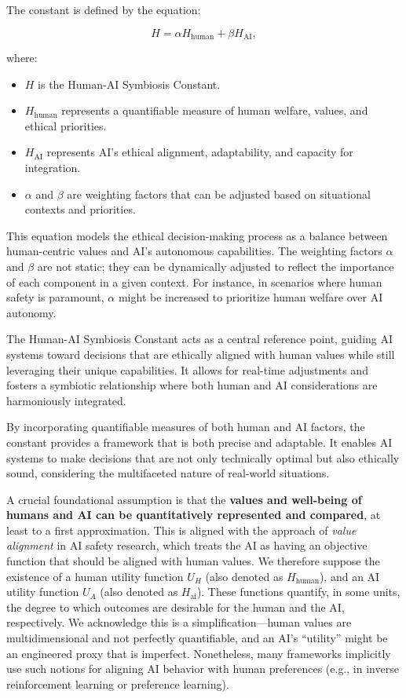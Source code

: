 \documentclass[12pt]{article}
\begin{document}
The constant is defined by the equation:

\begin{equation}
H = \alpha H_{\text{human}} + \beta H_{\text{AI}},
\end{equation}

where:

\begin{itemize}
    \item $H$ is the Human-AI Symbiosis Constant.
    \item $H_{\text{human}}$ represents a quantifiable measure of human welfare, values, and ethical priorities.
    \item $H_{\text{AI}}$ represents AI's ethical alignment, adaptability, and capacity for integration.
    \item $\alpha$ and $\beta$ are weighting factors that can be adjusted based on situational contexts and priorities.
\end{itemize}

This equation models the ethical decision-making process as a balance between human-centric values and AI's autonomous capabilities. The weighting factors $\alpha$ and $\beta$ are not static; they can be dynamically adjusted to reflect the importance of each component in a given context. For instance, in scenarios where human safety is paramount, $\alpha$ might be increased to prioritize human welfare over AI autonomy.

The Human-AI Symbiosis Constant acts as a central reference point, guiding AI systems toward decisions that are ethically aligned with human values while still leveraging their unique capabilities. It allows for real-time adjustments and fosters a symbiotic relationship where both human and AI considerations are harmoniously integrated.

By incorporating quantifiable measures of both human and AI factors, the constant provides a framework that is both precise and adaptable. It enables AI systems to make decisions that are not only technically optimal but also ethically sound, considering the multifaceted nature of real-world situations.

A crucial foundational assumption is that the \textbf{values and well-being of humans and AI can be quantitatively represented and compared}, at least to a first approximation. This is aligned with the approach of \emph{value alignment} in AI safety research, which treats the AI as having an objective function that should be aligned with human values. We therefore suppose the existence of a human utility function $U_H$ (also denoted as $H_{\text{human}}$), and an AI utility function $U_A$ (also denoted as $H_{\text{ai}}$). These functions quantify, in some units, the degree to which outcomes are desirable for the human and the AI, respectively. We acknowledge this is a simplification—human values are multidimensional and not perfectly quantifiable, and an AI’s “utility” might be an engineered proxy that is imperfect. Nonetheless, many frameworks implicitly use such notions for aligning AI behavior with human preferences (e.g., in inverse reinforcement learning or preference learning).
\end{document}

